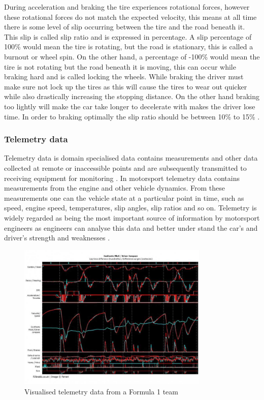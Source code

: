 During acceleration and braking the tire experiences rotational forces, however these rotational forces do not match the expected velocity, this means at all time there is some level of slip occurring between the tire and the road beneath it. This slip is called slip ratio and is expressed in percentage. A slip percentage of 100\% would mean the tire is rotating, but the road is stationary, this is called a burnout or wheel spin. On the other hand, a percentage of -100\% would mean the tire is not rotating but the road beneath it is moving, this can occur while braking hard and is called locking the wheels\cite{pacejka2006tire}. While braking the driver must make sure not lock up the tires as this will cause the tires to wear out quicker while also drastically increasing the stopping distance. On the other hand braking too lightly will make the car take longer to decelerate with makes the driver lose time. In order to braking optimally the slip ratio should be between 10\% to 15\% \cite{GoingFaster}.

\subsubsection{Telemetry data}
Telemetry data is domain specialised data contains measurements and other data collected at remote or inaccessible points and are subsequently transmitted to receiving equipment for monitoring \cite{nasaTelemetry}. In motorsport telemetry data contains measurements from the engine and other vehicle dynamics. From these measurements one can the vehicle state at a particular point in time, such as speed, engine speed, temperatures, slip angles, slip ratios and so on. Telemetry is widely regarded as being the most important source of information by motorsport engineers as engineers can analyse this data and better under stand the car's and driver's strength and weaknesses \cite{CarDataAnalysis}.

\begin{figure}[!htb]
	\centering
	\includegraphics[height=7cm]{charts/telemetrydata.jpg}
	\caption{Visualised telemetry data from a Formula 1 team}
	\label{fig:telemetrydata}
\end{figure}

